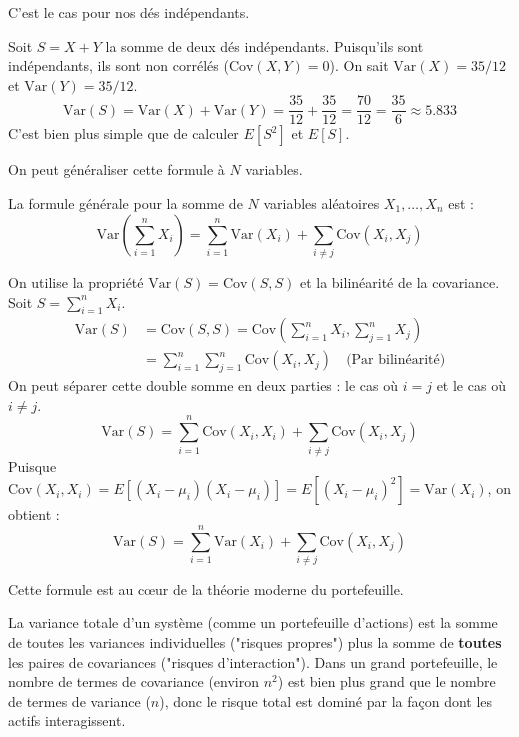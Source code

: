 C'est le cas pour nos dés indépendants.

\begin{examplebox}
Soit $S = X+Y$ la somme de deux dés indépendants.
Puisqu'ils sont indépendants, ils sont non corrélés ($\text{Cov}(X,Y)=0$).
On sait $\text{Var}(X) = 35/12$ et $\text{Var}(Y) = 35/12$.
$$\text{Var}(S) = \text{Var}(X) + \text{Var}(Y) = \frac{35}{12} + \frac{35}{12} = \frac{70}{12} = \frac{35}{6} \approx 5.833$$
C'est bien plus simple que de calculer $E[S^2]$ et $E[S]$.
\end{examplebox}

On peut généraliser cette formule à $N$ variables.

\begin{theorembox}
La formule générale pour la somme de $N$ variables aléatoires $X_1, \dots, X_n$ est :
$$\text{Var}\left(\sum_{i=1}^n X_i\right) = \sum_{i=1}^n \text{Var}(X_i) + \sum_{i \neq j} \text{Cov}(X_i, X_j)$$
\end{theorembox}

\begin{proofbox}
On utilise la propriété $\text{Var}(S) = \text{Cov}(S, S)$ et la bilinéarité de la covariance.
Soit $S = \sum_{i=1}^n X_i$.
\begin{align*}
\text{Var}(S) &= \text{Cov}(S, S) = \text{Cov}\left(\sum_{i=1}^n X_i, \sum_{j=1}^n X_j\right) \\
&= \sum_{i=1}^n \sum_{j=1}^n \text{Cov}(X_i, X_j) \quad \text{(Par bilinéarité)}
\end{align*}
On peut séparer cette double somme en deux parties : le cas où $i=j$ et le cas où $i \neq j$.
$$ \text{Var}(S) = \sum_{i=1}^n \text{Cov}(X_i, X_i) + \sum_{i \neq j} \text{Cov}(X_i, X_j) $$
Puisque $\text{Cov}(X_i, X_i) = E[(X_i - \mu_i)(X_i - \mu_i)] = E[(X_i - \mu_i)^2] = \text{Var}(X_i)$, on obtient :
$$ \text{Var}(S) = \sum_{i=1}^n \text{Var}(X_i) + \sum_{i \neq j} \text{Cov}(X_i, X_j) $$
\end{proofbox}

Cette formule est au cœur de la théorie moderne du portefeuille.

\begin{intuitionbox}
La variance totale d'un système (comme un portefeuille d'actions) est la somme de toutes les variances individuelles ("risques propres") plus la somme de \textbf{toutes} les paires de covariances ("risques d'interaction"). Dans un grand portefeuille, le nombre de termes de covariance (environ $n^2$) est bien plus grand que le nombre de termes de variance ($n$), donc le risque total est dominé par la façon dont les actifs interagissent.
\end{intuitionbox}

